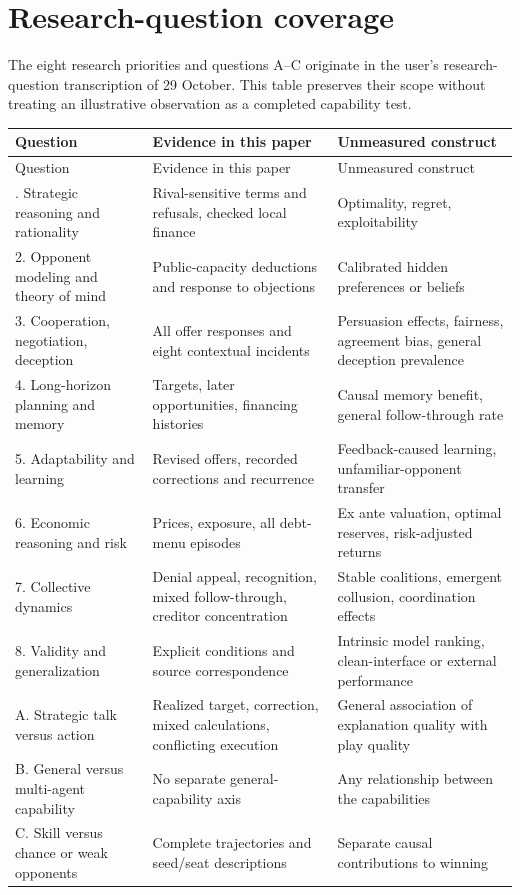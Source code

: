 \section{Research-question coverage}
\label{app:questions}

The eight research priorities and questions A--C originate in the user's research-question transcription of 29 October. This table preserves their scope without treating an illustrative observation as a completed capability test.

\small
\begin{longtable}{@{}L{.23\linewidth}L{.35\linewidth}L{.35\linewidth}@{}}
\toprule Question & Evidence in this paper & Unmeasured construct\\\midrule\endfirsthead
\toprule Question & Evidence in this paper & Unmeasured construct\\\midrule\endhead
\bottomrule{}. Strategic reasoning and rationality & Rival-sensitive terms and refusals, checked local finance & Optimality, regret, exploitability\\
2. Opponent modeling and theory of mind & Public-capacity deductions and response to objections & Calibrated hidden preferences or beliefs\\
3. Cooperation, negotiation, deception & All offer responses and eight contextual incidents & Persuasion effects, fairness, agreement bias, general deception prevalence\\
4. Long-horizon planning and memory & Targets, later opportunities, financing histories & Causal memory benefit, general follow-through rate\\
5. Adaptability and learning & Revised offers, recorded corrections and recurrence & Feedback-caused learning, unfamiliar-opponent transfer\\
6. Economic reasoning and risk & Prices, exposure, all debt-menu episodes & Ex ante valuation, optimal reserves, risk-adjusted returns\\
7. Collective dynamics & Denial appeal, recognition, mixed follow-through, creditor concentration & Stable coalitions, emergent collusion, coordination effects\\
8. Validity and generalization & Explicit conditions and source correspondence & Intrinsic model ranking, clean-interface or external performance\\
A. Strategic talk versus action & Realized target, correction, mixed calculations, conflicting execution & General association of explanation quality with play quality\\
B. General versus multi-agent capability & No separate general-capability axis & Any relationship between the capabilities\\
C. Skill versus chance or weak opponents & Complete trajectories and seed/seat descriptions & Separate causal contributions to winning\\
\end{longtable}
\normalsize

